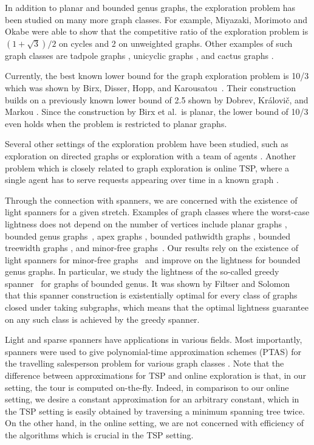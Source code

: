 \documentclass[a4paper,cleveref, autoref, thm-restate, thm-restate, UKenglish]{lipics-v2021}
\begin{document}
In addition to planar and bounded genus graphs, the exploration problem has been studied on many more graph classes. For example, Miyazaki, Morimoto and Okabe were able to show that the competitive ratio of the exploration problem is  $(1+\sqrt{3})/2$ on cycles and 2 on unweighted graphs. Other examples of such graph classes are tadpole graphs \cite{tadpole}, unicyclic graphs \cite{fritsch}, and cactus graphs \cite{fritsch}.

Currently, the best known lower bound for the graph exploration problem is 10/3 which was shown by Birx, Disser, Hopp, and Karousatou~\cite{birx}. Their construction builds on a previously known lower bound of 2.5 shown by Dobrev, Královič, and Markou \cite{dobrev}. Since the construction by Birx et al.~is planar, the lower bound of 10/3 even holds when the problem is restricted to planar graphs.

Several other settings of the exploration problem have been studied, such as exploration on directed graphs \cite{albers,deng, foerster, fleischer} or exploration with a team of agents \cite{dereniowski,DisserHackfeldKlimm/19, disserlower}. Another problem which is closely related to graph exploration is online TSP, where a single agent has to serve requests appearing over time in a known graph \cite{bjelde, bonifaci}.

Through the connection with spanners, we are concerned with the existence of light spanners for a given stretch.
Examples of graph classes where the worst-case lightness does not depend on the number of vertices include planar graphs \cite{althoefer}, bounded genus graphs~\cite{grigni}, apex graphs \cite{grigniapex}, bounded pathwidth graphs \cite{grignipathwidth}, bounded treewidth graphs \cite{demainetreewidth}, and minor-free graphs~\cite{minorspanner}.
Our results rely on the existence of light spanners for minor-free graphs~\cite{minorspanner} and improve on the lightness for bounded genus graphs.
In particular, we study the lightness of the so-called greedy spanner~\cite{althoefer} for graphs of bounded genus. 
It was shown by Filtser and Solomon~\cite{filtser} that this spanner construction is existentially optimal for every class of graphs closed under taking subgraphs, which means that the optimal lightness guarantee on any such class is achieved by the greedy spanner.

Light and sparse spanners have applications in various fields. Most importantly, spanners were used to give polynomial-time approximation schemes (PTAS) for the travelling salesperson problem for various graph classes \cite{arora, borradaile, minorspanner}. 
Note that the difference between approximations for TSP and online exploration is that, in our setting, the tour is computed on-the-fly. 
Indeed, in comparison to our online setting, we desire a constant approximation for an arbitrary constant, which in the TSP setting is easily obtained by traversing a minimum spanning tree twice. On the other hand, in the online setting, we are not concerned with efficiency of the algorithms which is crucial in the TSP setting.
\end{document}
